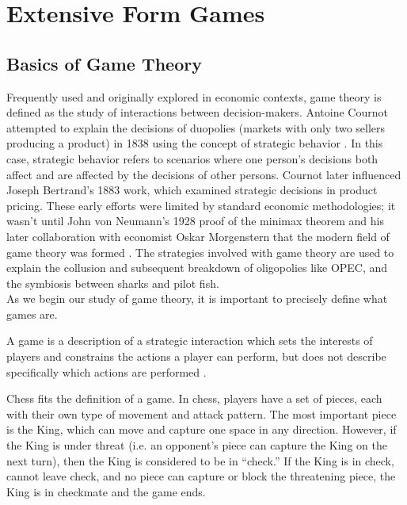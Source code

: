 \chapter{Extensive Form Games}
\section{Basics of Game Theory}
Frequently used and originally explored in economic contexts, game theory is defined as the study of interactions between decision-makers. Antoine Cournot attempted to explain the decisions of duopolies (markets with only two sellers producing a product) in 1838 using the concept of strategic behavior \cite{webs14}. In this case, strategic behavior refers to scenarios where one person's decisions both affect and are affected by the decisions of other persons. Cournot later influenced Joseph Bertrand's 1883 work, which examined strategic decisions in product pricing. These early efforts were limited by standard economic methodologies; it wasn't until John von Neumann's 1928 proof of the minimax theorem and his later collaboration with economist Oskar Morgenstern that the modern field of game theory was formed \cite{webs14}. The strategies involved with game theory are used to explain the collusion and subsequent breakdown of oligopolies like OPEC, and the symbiosis between sharks and pilot fish.\\

As we begin our study of game theory, it is important to precisely define what games are.\\
\newpage
\begin{define}
  A game is a description of a strategic interaction which sets the interests of players and constrains the actions a player can perform, but does not describe specifically which actions are performed \cite{osbo94}.
\end{define}

\begin{exmp}
  Chess fits the definition of a game. In chess, players have a set of pieces, each with their own type of movement and attack pattern. The most important piece is the King, which can move and capture one space in any direction. However, if the King is under threat (i.e. an opponent's piece can capture the King on the next turn), then the King is considered to be in ``check.'' If the King is in check, cannot leave check, and no piece can capture or block the threatening piece, the King is in checkmate and the game ends.
\end{exmp}

